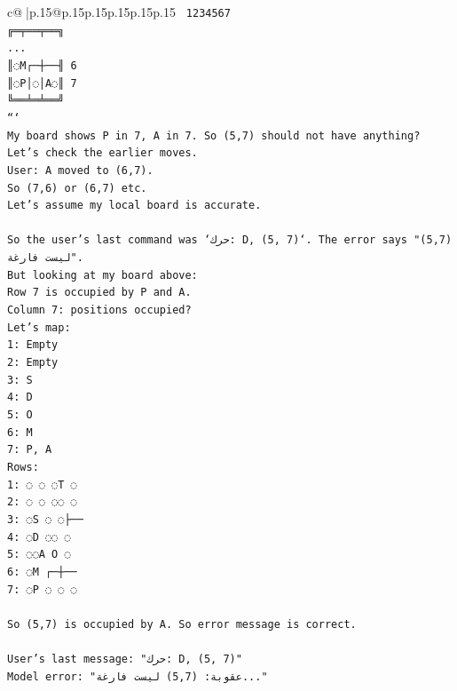 \documentclass{article}
\begin{document}
{\begin{supertabular}{c@{$\;$}|p{.15\linewidth}@{}p{.15\linewidth}p{.15\linewidth}p{.15\linewidth}p{.15\linewidth}p{.15\linewidth}}
{{{\texttt{ 1234567} \\
\texttt{╔═╤══╤══╗} \\
\texttt{...} \\
\texttt{║◌M┌─┼──╢ 6} \\
\texttt{║◌P│◌│A◌║ 7} \\
\texttt{╚══╧═╧══╝} \\
\texttt{```} \\
\texttt{My board shows P in 7, A in 7. So (5,7) should not have anything? Let's check the earlier moves.} \\
\texttt{User: A moved to (6,7).} \\
\texttt{So (7,6) or (6,7) etc.} \\
\texttt{Let's assume my local board is accurate.} \\
\\ 
\texttt{So the user's last command was `حرك: D, (5, 7)`. The error says "(5,7) ليست فارغة".} \\
\texttt{But looking at my board above:} \\
\texttt{Row 7 is occupied by P and A.} \\
\texttt{Column 7: positions occupied?} \\
\texttt{Let's map:} \\
\texttt{1: Empty} \\
\texttt{2: Empty} \\
\texttt{3: S} \\
\texttt{4: D} \\
\texttt{5: O} \\
\texttt{6: M} \\
\texttt{7: P, A} \\
\texttt{Rows:} \\
\texttt{1: ◌ ◌ ◌T ◌} \\
\texttt{2: ◌ ◌ ◌◌ ◌} \\
\texttt{3: ◌S ◌ ◌├──} \\
\texttt{4: ◌D ◌◌ ◌} \\
\texttt{5: ◌◌A O ◌} \\
\texttt{6: ◌M ┌─┼──} \\
\texttt{7: ◌P ◌ ◌ ◌} \\
\\ 
\texttt{So (5,7) is occupied by A. So error message is correct.} \\
\\ 
\texttt{User's last message: "حرك: D, (5, 7)"} \\
\texttt{Model error: "عقوبة: (5,7) ليست فارغة..."} \\
}}}
\end{supertabular}}
\end{document}
